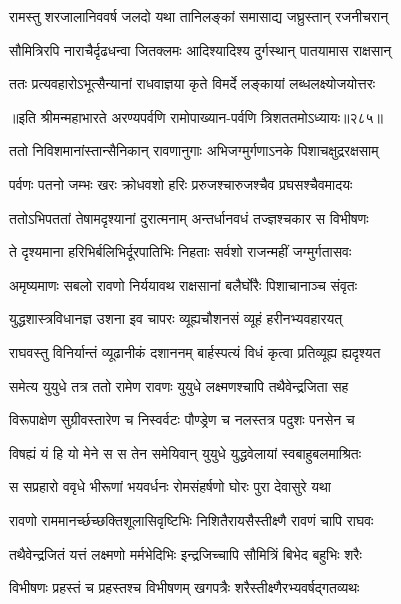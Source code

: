 \twolineshloka
{रामस्तु शरजालानिववर्ष जलदो यथा}
{तानिलङ्कां समासाद्य जघ्रुस्तान् रजनीचरान्}


\twolineshloka
{सौमित्रिरपि नाराचैर्दृढधन्वा जितक्लमः}
{आदिश्यादिश्य दुर्गस्थान् पातयामास राक्षसान्}


\twolineshloka
{ततः प्रत्यवहारोऽभूत्सैन्यानां राधवाज्ञया}
{कृते विमर्दे लङ्कायां लब्धलक्ष्योजयोत्तरः}


॥इति श्रीमन्महाभारते अरण्यपर्वणि रामोपाख्यान-पर्वणि त्रिशततमोऽध्यायः॥२८५॥

\storymeta

\resetShloka



\twolineshloka
{ततो निविशमानांस्तान्सैनिकान् रावणानुगाः}
{अभिजग्मुर्गणाऽनके पिशाचक्षुद्ररक्षसाम्}


\twolineshloka
{पर्वणः पतनो जम्भः खरः क्रोधवशो हरिः}
{प्ररुजश्चारुजश्चैव प्रघसश्चैवमादयः}


\twolineshloka
{ततोऽभिपततां तेषामदृश्यानां दुरात्मनाम्}
{अन्तर्धानवधं तज्ज्ञश्चकार स विभीषणः}


\twolineshloka
{ते दृश्यमाना हरिभिर्बलिभिर्दूरपातिभिः}
{निहताः सर्वशो राजन्महीं जग्मुर्गतासवः}


\twolineshloka
{अमृष्यमाणः सबलो रावणो निर्ययावथ}
{राक्षसानां बलैर्घोरैः पिशाचानाञ्च संवृतः}


\twolineshloka
{युद्धशास्त्रविधानज्ञ उशना इव चापरः}
{व्यूह्यचौशनसं व्यूहं हरीनभ्यवहारयत्}


\twolineshloka
{राघवस्तु विनिर्यान्तं व्यूढानीकं दशाननम्}
{बार्हस्पत्यं विधं कृत्वा प्रतिव्यूह्य ह्यदृश्यत}


\twolineshloka
{समेत्य युयुधे तत्र ततो रामेण रावणः}
{युयुधे लक्ष्मणश्चापि तथैवेन्द्रजिता सह}


\twolineshloka
{विरूपाक्षेण सुग्रीवस्तारेण च निस्वर्वटः}
{पौण्ड्रेण च नलस्तत्र पदुशः पनसेन च}


\twolineshloka
{विषह्यं यं हि यो मेने स स तेन समेयिवान्}
{युयुधे युद्धवेलायां स्वबाहुबलमाश्रितः}


\twolineshloka
{स सप्रहारो ववृधे भीरूणां भयवर्धनः}
{रोमसंहर्षणो घोरः पुरा देवासुरे यथा}


\twolineshloka
{रावणो राममानर्च्छच्छक्तिशूलासिवृष्टिभिः}
{निशितैरायसैस्तीक्ष्णै रावणं चापि राघवः}


\twolineshloka
{तथैवेन्द्रजितं यत्तं लक्ष्मणो मर्मभेदिभिः}
{इन्द्रजिच्चापि सौमित्रिं बिभेद बहुभिः शरैः}


\twolineshloka
{विभीषणः प्रहस्तं च प्रहस्तश्च विभीषणम्}
{खगपत्रैः शरैस्तीक्ष्णैरभ्यवर्षद्गतव्यथः}


